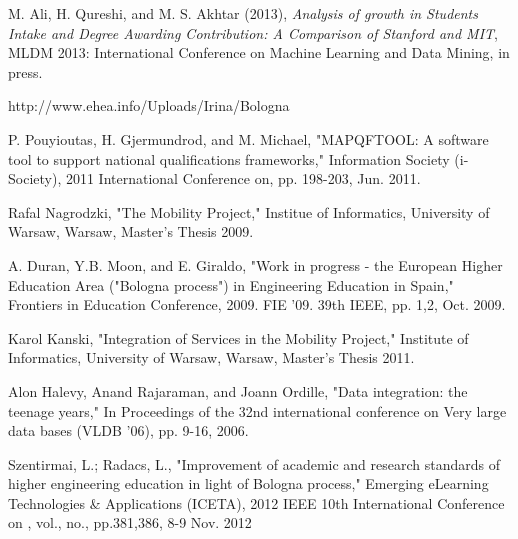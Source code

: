 \documentclass[12pt,a4paper,oneside]{book} %
\begin{document}
\begin{thebibliography}{10}

M. Ali, H. Qureshi, and M. S. Akhtar (2013), \emph{Analysis of growth in Students Intake and Degree Awarding Contribution: A Comparison of Stanford and MIT}, MLDM 2013: International Conference on Machine Learning and Data Mining, in press.

http://www.ehea.info/Uploads/Irina/Bologna%

P. Pouyioutas, H. Gjermundrod, and M. Michael, "MAPQFTOOL: A software tool to support national qualifications frameworks," Information Society (i-Society), 2011 International Conference on, pp. 198-203, Jun. 2011.

Rafal Nagrodzki, "The Mobility Project," Institue of Informatics, University of Warsaw, Warsaw, Master's Thesis 2009.

A. Duran, Y.B. Moon, and E. Giraldo, "Work in progress - the European Higher Education Area ("Bologna process") in Engineering Education in Spain," Frontiers in Education Conference, 2009. FIE '09. 39th IEEE, pp. 1,2, Oct. 2009.

Karol Kanski, "Integration of Services in the Mobility Project," Institute of Informatics, University of Warsaw, Warsaw, Master's Thesis 2011.

Alon Halevy, Anand Rajaraman, and Joann Ordille, "Data integration: the teenage years," In Proceedings of the 32nd international conference on Very large data bases (VLDB '06), pp. 9-16, 2006.

Szentirmai, L.; Radacs, L., "Improvement of academic and research standards of higher engineering education in light of Bologna process," Emerging eLearning Technologies \& Applications (ICETA), 2012 IEEE 10th International Conference on , vol., no., pp.381,386, 8-9 Nov. 2012

\end{thebibliography}
\end{document}
